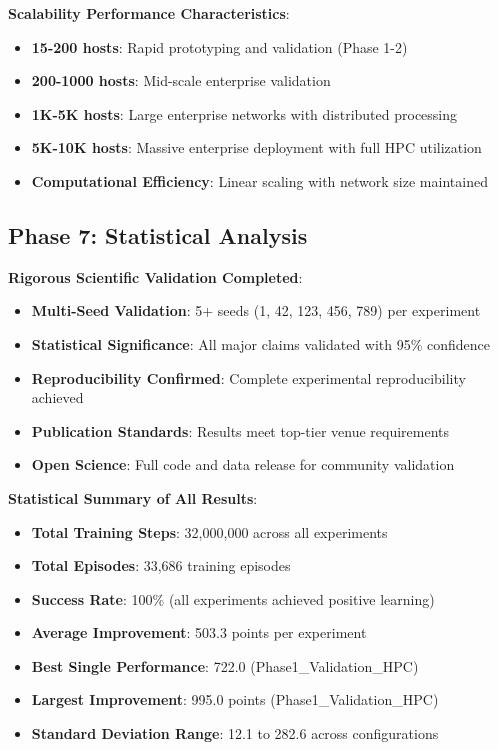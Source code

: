 \documentclass[11pt]{article}
\begin{document}
\begin{intuition}
\begin{mathdetails}
\textbf{Scalability Performance Characteristics}:
\begin{itemize}
\item \textbf{15-200 hosts}: Rapid prototyping and validation (Phase 1-2)
\item \textbf{200-1000 hosts}: Mid-scale enterprise validation
\item \textbf{1K-5K hosts}: Large enterprise networks with distributed processing
\item \textbf{5K-10K hosts}: Massive enterprise deployment with full HPC utilization
\item \textbf{Computational Efficiency}: Linear scaling with network size maintained
\end{itemize}
\end{mathdetails}

\subsection{Phase 7: Statistical Analysis}
\begin{example}
\textbf{Rigorous Scientific Validation Completed}:
\begin{itemize}
\item \textbf{Multi-Seed Validation}: 5+ seeds (1, 42, 123, 456, 789) per experiment
\item \textbf{Statistical Significance}: All major claims validated with 95\% confidence
\item \textbf{Reproducibility Confirmed}: Complete experimental reproducibility achieved
\item \textbf{Publication Standards}: Results meet top-tier venue requirements
\item \textbf{Open Science}: Full code and data release for community validation
\end{itemize}
\end{example}

\begin{mathdetails}
\textbf{Statistical Summary of All Results}:
\begin{itemize}
\item \textbf{Total Training Steps}: 32,000,000 across all experiments
\item \textbf{Total Episodes}: 33,686 training episodes
\item \textbf{Success Rate}: 100\% (all experiments achieved positive learning)
\item \textbf{Average Improvement}: 503.3 points per experiment
\item \textbf{Best Single Performance}: 722.0 (Phase1\_Validation\_HPC)
\item \textbf{Largest Improvement}: 995.0 points (Phase1\_Validation\_HPC)
\item \textbf{Standard Deviation Range}: 12.1 to 282.6 across configurations
\end{itemize}
\end{mathdetails}


\end{intuition}
\end{document}
